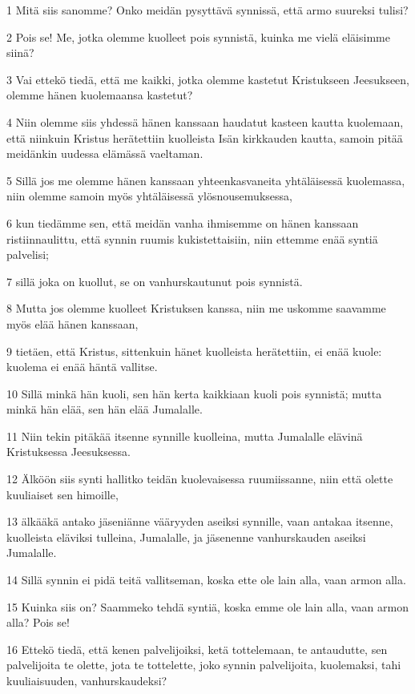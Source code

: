 \par 1 Mitä siis sanomme? Onko meidän pysyttävä synnissä, että armo suureksi tulisi?
\par 2 Pois se! Me, jotka olemme kuolleet pois synnistä, kuinka me vielä eläisimme siinä?
\par 3 Vai ettekö tiedä, että me kaikki, jotka olemme kastetut Kristukseen Jeesukseen, olemme hänen kuolemaansa kastetut?
\par 4 Niin olemme siis yhdessä hänen kanssaan haudatut kasteen kautta kuolemaan, että niinkuin Kristus herätettiin kuolleista Isän kirkkauden kautta, samoin pitää meidänkin uudessa elämässä vaeltaman.
\par 5 Sillä jos me olemme hänen kanssaan yhteenkasvaneita yhtäläisessä kuolemassa, niin olemme samoin myös yhtäläisessä ylösnousemuksessa,
\par 6 kun tiedämme sen, että meidän vanha ihmisemme on hänen kanssaan ristiinnaulittu, että synnin ruumis kukistettaisiin, niin ettemme enää syntiä palvelisi;
\par 7 sillä joka on kuollut, se on vanhurskautunut pois synnistä.
\par 8 Mutta jos olemme kuolleet Kristuksen kanssa, niin me uskomme saavamme myös elää hänen kanssaan,
\par 9 tietäen, että Kristus, sittenkuin hänet kuolleista herätettiin, ei enää kuole: kuolema ei enää häntä vallitse.
\par 10 Sillä minkä hän kuoli, sen hän kerta kaikkiaan kuoli pois synnistä; mutta minkä hän elää, sen hän elää Jumalalle.
\par 11 Niin tekin pitäkää itsenne synnille kuolleina, mutta Jumalalle elävinä Kristuksessa Jeesuksessa.
\par 12 Älköön siis synti hallitko teidän kuolevaisessa ruumiissanne, niin että olette kuuliaiset sen himoille,
\par 13 älkääkä antako jäseniänne vääryyden aseiksi synnille, vaan antakaa itsenne, kuolleista eläviksi tulleina, Jumalalle, ja jäsenenne vanhurskauden aseiksi Jumalalle.
\par 14 Sillä synnin ei pidä teitä vallitseman, koska ette ole lain alla, vaan armon alla.
\par 15 Kuinka siis on? Saammeko tehdä syntiä, koska emme ole lain alla, vaan armon alla? Pois se!
\par 16 Ettekö tiedä, että kenen palvelijoiksi, ketä tottelemaan, te antaudutte, sen palvelijoita te olette, jota te tottelette, joko synnin palvelijoita, kuolemaksi, tahi kuuliaisuuden, vanhurskaudeksi?
